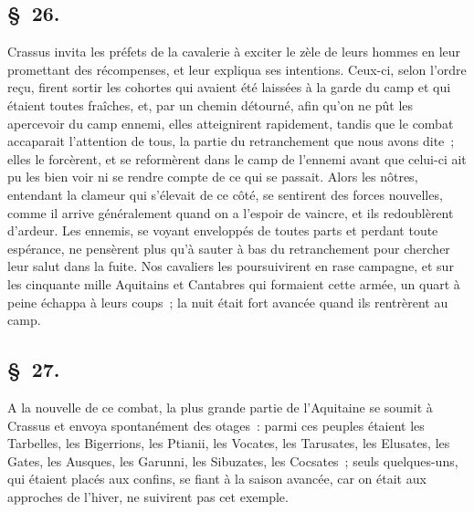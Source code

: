 \documentclass[french,twoside]{book} %
\begin{document}
\subsection[{§ 26.}]{ \textsc{§ 26.} }
\noindent Crassus invita les préfets de la cavalerie à exciter le zèle de leurs hommes en leur promettant des récompenses, et leur expliqua ses intentions. Ceux-ci, selon l’ordre reçu, firent sortir les cohortes qui avaient été laissées à la garde du camp et qui étaient toutes fraîches, et, par un chemin détourné, afin qu’on ne pût les apercevoir du camp ennemi, elles atteignirent rapidement, tandis que le combat accaparait l’attention de tous, la partie du retranchement que nous avons dite ; elles le forcèrent, et se reformèrent dans le camp de l’ennemi avant que celui-ci ait pu les bien voir ni se rendre compte de ce qui se passait. Alors les nôtres, entendant la clameur qui s’élevait de ce côté, se sentirent des forces nouvelles, comme il arrive généralement quand on a l’espoir de vaincre, et ils redoublèrent d’ardeur. Les ennemis, se voyant enveloppés de toutes parts et perdant toute espérance, ne pensèrent plus qu’à sauter à bas du retranchement pour chercher leur salut dans la fuite. Nos cavaliers les poursuivirent en rase campagne, et sur les cinquante mille Aquitains et Cantabres qui formaient cette armée, un quart à peine échappa à leurs coups ; la nuit était fort avancée quand ils rentrèrent au camp.
\subsection[{§ 27.}]{ \textsc{§ 27.} }
\noindent A la nouvelle de ce combat, la plus grande partie de l’Aquitaine se soumit à Crassus et envoya spontanément des otages : parmi ces peuples étaient les Tarbelles, les Bigerrions, les Ptianii, les Vocates, les Tarusates, les Elusates, les Gates, les Ausques, les Garunni, les Sibuzates, les Cocsates ; seuls quelques-uns, qui étaient placés aux confins, se fiant à la saison avancée, car on était aux approches de l’hiver, ne suivirent pas cet exemple.
\end{document}
